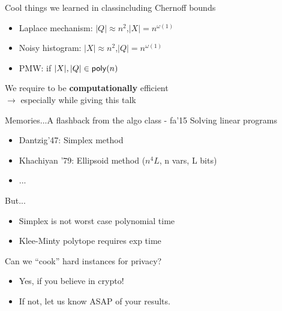 \begin{frame}{Cool things we learned in class}{including Chernoff bounds}
  \begin{itemize}
    \item Laplace mechanism: $|Q| \approx n^2$,\quad $|X| = n^{\omega(1)}$ 
    \item Noisy histogram: $|X| \approx n^2$,\quad $|Q| = n^{\omega(1)}$
    \item PMW: if $|X|,|Q| \in \mathsf{poly}(n)$
  \end{itemize}
  \vspace{1em}
  We require to be \textbf{computationally} efficient
  \\$\rightarrow$ especially while giving this talk
\end{frame}


\begin{frame}{Memories...}{A flashback from the algo class - fa'15}
  Solving linear programs
  
  \begin{itemize}
  \item Dantzig'47: Simplex method 
  \item Khachiyan '79: Ellipsoid method ($n^4L$, n vars, L bits)
  \item ...
  \end{itemize}

  But...
  \begin{itemize}
    \item Simplex is not worst case polynomial time
    \item Klee-Minty polytope requires exp time
  \end{itemize}
  \vspace{1em}
  Can we ``cook'' hard instances for privacy?
	\begin{itemize}
		\item Yes, if you believe in crypto!
		\item If not, let us know ASAP of your results.
	\end{itemize}
\end{frame}

